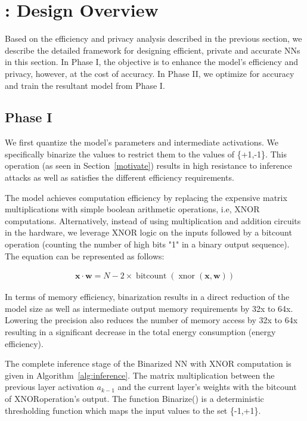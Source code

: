 \section{\method: Design Overview}\label{design}

Based on the efficiency and privacy analysis described in the previous section, we describe the detailed \method\hspace{0.02in} framework for designing efficient, private and accurate NNs in this section.
In Phase I, the objective is to enhance the model's efficiency and privacy, however, at the cost of accuracy.
In Phase II, we optimize for accuracy and train the resultant model from Phase I.


\subsection{Phase I}

We first quantize the model's parameters and intermediate activations. We specifically binarize the values to restrict them to the values of \{+1,-1\}.
This operation (as seen in Section~\ref{motivate}) results in high resistance to inference attacks as well as satisfies the different efficiency requirements.

The model achieves computation efficiency by replacing the expensive matrix multiplications with simple boolean arithmetic operations, i.e, XNOR computations.
Alternatively, instead of using multiplication and addition circuits in the hardware, we leverage XNOR logic on the inputs followed by a bitcount operation (counting the number of high bits "1" in a binary output sequence).
The equation can be represented as follows:

\begin{align}
\mathbf{x} \cdot \mathbf{w} =
N - 2\times\operatorname{bitcount}(\operatorname{xnor}(\mathbf{x}, \mathbf{w}))
\end{align}

In terms of memory efficiency, binarization results in a direct reduction of the model size as well as intermediate output memory requirements by 32x to 64x.
Lowering the precision also reduces the number of memory access by 32x to 64x resulting in a significant decrease in the total energy consumption (energy efficiency).


The complete inference stage of the Binarized NN with XNOR computation is given in Algorithm~\ref{alg:inference}.
The matrix multiplication between the previous layer activation $a_{k-1}$ and the current layer's weights with the bitcount of XNORoperation's output.
The function Binarize() is a deterministic thresholding function which maps the input values to the set \{-1,+1\}.

